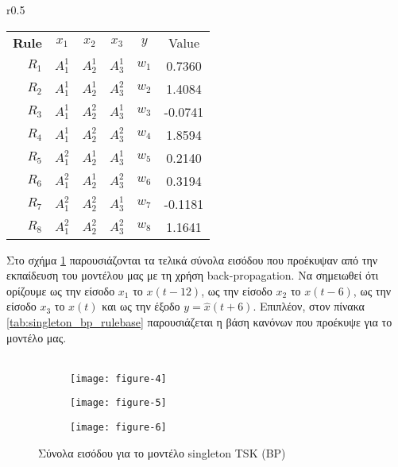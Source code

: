 \documentclass[11pt,a4paper,titlepage, oneside]{article}
\newlength\figureheight
\newlength\figurewidth
\begin{document}
			\begin{wraptable}{r}{0.5\textwidth}
				\centering
				\begin{tabular}[b]{r c c c||c|c}
					 \bfseries{Rule} & $x_1$ & $x_2$ & $x_3$ & $y$ & Value\\ \hhline{====||=|=}
						$R_{1}$ & $A_1^1$ & $A_2^1$ & $A_3^1$ & $w_1$ & 0.7360 \\%
						$R_{2}$ & $A_1^1$ & $A_2^1$ & $A_3^2$ & $w_2$ & 1.4084 \\%
						$R_{3}$ & $A_1^1$ & $A_2^2$ & $A_3^1$ & $w_3$ & -0.0741\\%
						$R_{4}$ & $A_1^1$ & $A_2^2$ & $A_3^2$ & $w_4$ & 1.8594 \\%
						$R_{5}$ & $A_1^2$ & $A_2^1$ & $A_3^1$ & $w_5$ & 0.2140 \\%
						$R_{6}$ & $A_1^2$ & $A_2^1$ & $A_3^2$ & $w_6$ & 0.3194 \\%
						$R_{7}$ & $A_1^2$ & $A_2^2$ & $A_3^1$ & $w_7$ & -0.1181\\%
						$R_{8}$ & $A_1^2$ & $A_2^2$ & $A_3^2$ & $w_8$ & 1.1641 \\%
				\end{tabular}
				\caption{Ασαφής βάση κανόνων για το μοντέλο singleton TSK (BP)}
				\label{tab:singleton_bp_rulebase}
			\end{wraptable}

			Στο σχήμα \ref{fig:singleton_bp_input_sets} παρουσιάζονται τα τελικά σύνολα εισόδου που προέκυψαν από την εκπαίδευση του μοντέλου μας με τη χρήση back-propagation. Να σημειωθεί ότι ορίζουμε ως την είσοδο $x_1$ το $x(t-12)$, ως την είσοδο $x_2$ το $x(t-6)$, ως την είσοδο $x_3$ το $x(t)$ και ως την έξοδο $y = \hat{x}(t+6)$. Επιπλέον, στον πίνακα \ref{tab:singleton_bp_rulebase} παρουσιάζεται η βάση κανόνων που προέκυψε για το μοντέλο μας. \\ \\
			
			\begin{figure}
			 	\setlength{}
				\setlength{}	
				\centering
				\begin{subfigure}[b]{0.32\textwidth}
					\texttt{[image: figure-4]}
				\end{subfigure}
				\begin{subfigure}[b]{0.32\textwidth}
					\texttt{[image: figure-5]}
				\end{subfigure}
				\begin{subfigure}[b]{0.32\textwidth}
					\texttt{[image: figure-6]}
				\end{subfigure}
				\caption{Σύνολα εισόδου για το μοντέλο singleton TSK (BP)}
				\label{fig:singleton_bp_input_sets}
			\end{figure}
				
\end{document}
